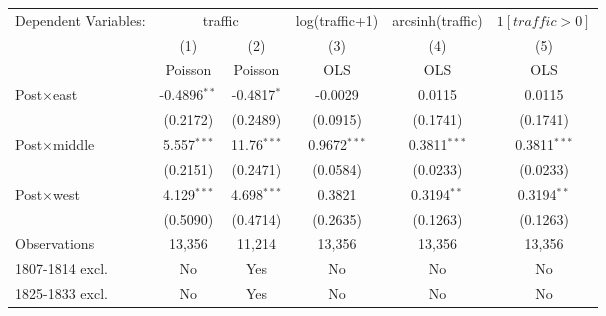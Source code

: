 \begin{tabular}{lccccc}
   \tabularnewline \midrule \midrule
   Dependent Variables: & \multicolumn{2}{c}{traffic}     & log(traffic+1)  & arcsinh(traffic)  & $1[traffic>0]$\\
                        & (1)            & (2)            & (3)             & (4)             & (5)\\  
                        & Poisson        & Poisson        & OLS             & OLS             & OLS\\  
   \midrule
   Post$\times$east     & -0.4896$^{**}$ & -0.4817$^{*}$  & -0.0029         & 0.0115          & 0.0115\\   
                        & (0.2172)       & (0.2489)       & (0.0915)        & (0.1741)        & (0.1741)\\   
   Post$\times$middle   & 5.557$^{***}$  & 11.76$^{***}$  & 0.9672$^{***}$  & 0.3811$^{***}$  & 0.3811$^{***}$\\   
                        & (0.2151)       & (0.2471)       & (0.0584)        & (0.0233)        & (0.0233)\\   
   Post$\times$west     & 4.129$^{***}$  & 4.698$^{***}$  & 0.3821          & 0.3194$^{**}$   & 0.3194$^{**}$\\   
                        & (0.5090)       & (0.4714)       & (0.2635)        & (0.1263)        & (0.1263)\\   
   \midrule
   Observations         & 13,356         & 11,214         & 13,356          & 13,356          & 13,356\\  
   \midrule
   1807-1814 excl.      & No             & Yes            & No              & No              & No\\
   1825-1833 excl.      & No             & Yes            & No              & No              & No\\
   \midrule \midrule
\end{tabular}